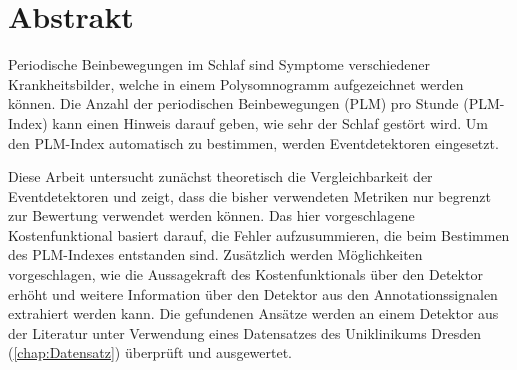 \section{Abstrakt}
Periodische Beinbewegungen im Schlaf sind Symptome verschiedener Krankheitsbilder, welche in einem Polysomnogramm aufgezeichnet werden können. Die Anzahl der periodischen Beinbewegungen (PLM) pro Stunde (PLM-Index) kann einen Hinweis darauf geben, wie sehr der Schlaf gestört wird. Um den PLM-Index automatisch zu bestimmen, werden Eventdetektoren eingesetzt. 

Diese Arbeit untersucht zunächst theoretisch die Vergleichbarkeit der Eventdetektoren und zeigt, dass die bisher verwendeten Metriken nur begrenzt zur Bewertung verwendet werden können. Das hier vorgeschlagene Kostenfunktional basiert darauf, die Fehler aufzusummieren, die beim Bestimmen des PLM-Indexes entstanden sind. 
Zusätzlich werden Möglichkeiten vorgeschlagen, wie die Aussagekraft des Kostenfunktionals über den Detektor erhöht und weitere Information über den Detektor aus den Annotationssignalen extrahiert werden kann.
Die gefundenen Ansätze werden an einem Detektor aus der Literatur \cite{Moore} unter Verwendung eines Datensatzes des Uniklinikums Dresden (\ref{chap:Datensatz}) überprüft und ausgewertet. 
